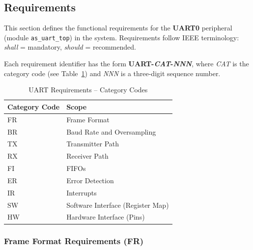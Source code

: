 
\label{sec:uartfunc01}

\subsection{Requirements}
\label{subsec:uartreq01}

This section defines the functional requirements for the \textbf{UART0}
peripheral (module \texttt{as\_uart\_top}) in the \aschip{} system.
Requirements follow IEEE terminology:
\textit{shall} = mandatory, \textit{should} = recommended.

Each requirement identifier has the form
\textbf{UART-\textit{CAT}-\textit{NNN}}, where \textit{CAT} is the
category code (see Table~\ref{tab:asUartReqCat}) and \textit{NNN} is a
three-digit sequence number.

\begin{table}[H]
\caption{UART Requirements -- Category Codes}
\label{tab:asUartReqCat}
\centering
\begin{tabularx}{\textwidth}{|l |X|}
  \hline
  Category Code & Scope \\
  \hline
  \hline
  FR & Frame Format \\
  \hline
  BR & Baud Rate and Oversampling \\
  \hline
  TX & Transmitter Path \\
  \hline
  RX & Receiver Path \\
  \hline
  FI & FIFOs \\
  \hline
  ER & Error Detection \\
  \hline
  IR & Interrupts \\
  \hline
  SW & Software Interface (Register Map) \\
  \hline
  HW & Hardware Interface (Pins) \\
  \hline
\end{tabularx}
\end{table}

\subsubsection{Frame Format Requirements (FR)}

